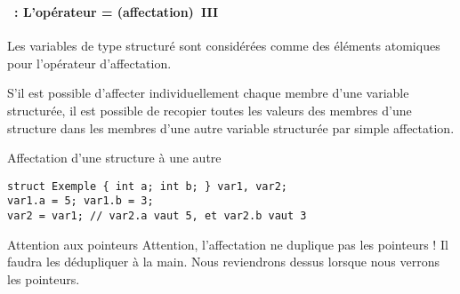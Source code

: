 \begin{frame}[containsverbatim]
  \frametitle{\secname}
  \framesubtitle{\subsecname~: L'opérateur = (affectation)~III} 

  Les variables de type structuré sont considérées comme des éléments atomiques pour l'opérateur d'affectation.
  \vspace{0.3cm}
  \par
  S'il est possible d'affecter individuellement chaque membre d'une variable structurée, il est possible de recopier toutes les valeurs
  des membres d'une structure dans les membres d'une autre variable structurée par simple affectation.
  \begin{exampleblock}{Affectation d'une structure à une autre}
    \begin{verbatim}
struct Exemple { int a; int b; } var1, var2;
var1.a = 5; var1.b = 3;
var2 = var1; // var2.a vaut 5, et var2.b vaut 3\end{verbatim}
  \end{exampleblock}
  {\small\begin{alertblock}{Attention aux pointeurs}
    Attention, l'affectation ne duplique pas les pointeurs ! Il faudra les dédupliquer à la main. Nous reviendrons dessus lorsque nous verrons
    les pointeurs.
  \end{alertblock}}
\end{frame}

